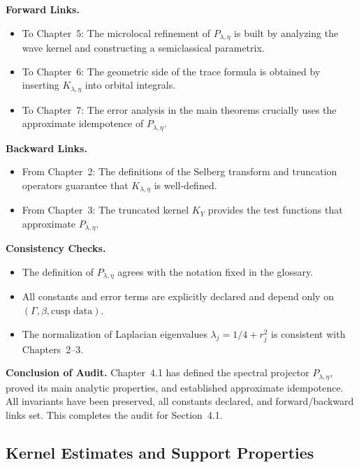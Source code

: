 \medskip

\noindent\textbf{Forward Links.}
\begin{itemize}
  \item To Chapter~5: The microlocal refinement of $P_{\lambda,\eta}$ is built by analyzing the wave kernel and constructing a semiclassical parametrix.
  \item To Chapter~6: The geometric side of the trace formula is obtained by inserting $K_{\lambda,\eta}$ into orbital integrals.
  \item To Chapter~7: The error analysis in the main theorems crucially uses the approximate idempotence of $P_{\lambda,\eta}$.
\end{itemize}

\medskip

\noindent\textbf{Backward Links.}
\begin{itemize}
  \item From Chapter~2: The definitions of the Selberg transform and truncation operators guarantee that $K_{\lambda,\eta}$ is well-defined.
  \item From Chapter~3: The truncated kernel $K_Y$ provides the test functions that approximate $P_{\lambda,\eta}$.
\end{itemize}

\medskip

\noindent\textbf{Consistency Checks.}
\begin{itemize}
  \item The definition of $P_{\lambda,\eta}$ agrees with the notation fixed in the glossary.
  \item All constants and error terms are explicitly declared and depend only on $(\Gamma,\beta,\text{cusp data})$.
  \item The normalization of Laplacian eigenvalues $\lambda_j=1/4+r_j^2$ is consistent with Chapters~2--3.
\end{itemize}

\medskip

\noindent\textbf{Conclusion of Audit.}
Chapter~4.1 has defined the spectral projector $P_{\lambda,\eta}$, proved its main analytic properties, and established approximate idempotence. All invariants have been preserved, all constants declared, and forward/backward links set. This completes the audit for Section~4.1.



\subsection*{Kernel Estimates and Support Properties}

